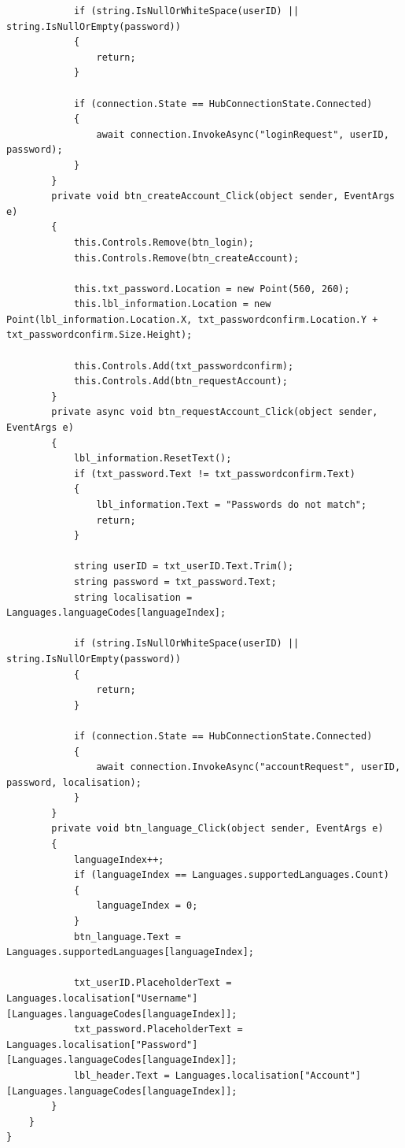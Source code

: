 \documentclass{article}
\begin{document}
\begin{verbatim}
			if (string.IsNullOrWhiteSpace(userID) || string.IsNullOrEmpty(password))
			{
				return;
			}

			if (connection.State == HubConnectionState.Connected)
			{
				await connection.InvokeAsync("loginRequest", userID, password);
			}
		}
		private void btn_createAccount_Click(object sender, EventArgs e)
		{
			this.Controls.Remove(btn_login);
			this.Controls.Remove(btn_createAccount);

			this.txt_password.Location = new Point(560, 260);
			this.lbl_information.Location = new Point(lbl_information.Location.X, txt_passwordconfirm.Location.Y + txt_passwordconfirm.Size.Height);

			this.Controls.Add(txt_passwordconfirm);
			this.Controls.Add(btn_requestAccount);
		}
		private async void btn_requestAccount_Click(object sender, EventArgs e)
		{
			lbl_information.ResetText();
			if (txt_password.Text != txt_passwordconfirm.Text)
			{
				lbl_information.Text = "Passwords do not match";
				return;
			}

			string userID = txt_userID.Text.Trim();
			string password = txt_password.Text;
			string localisation = Languages.languageCodes[languageIndex];

			if (string.IsNullOrWhiteSpace(userID) || string.IsNullOrEmpty(password))
			{
				return;
			}

			if (connection.State == HubConnectionState.Connected)
			{
				await connection.InvokeAsync("accountRequest", userID, password, localisation);
			}
		}
		private void btn_language_Click(object sender, EventArgs e)
		{
			languageIndex++;
			if (languageIndex == Languages.supportedLanguages.Count)
			{
				languageIndex = 0;
			}
			btn_language.Text = Languages.supportedLanguages[languageIndex];

			txt_userID.PlaceholderText = Languages.localisation["Username"][Languages.languageCodes[languageIndex]];
			txt_password.PlaceholderText = Languages.localisation["Password"][Languages.languageCodes[languageIndex]];
			lbl_header.Text = Languages.localisation["Account"][Languages.languageCodes[languageIndex]];
		}
	}
}
\end{verbatim}
\end{document}
